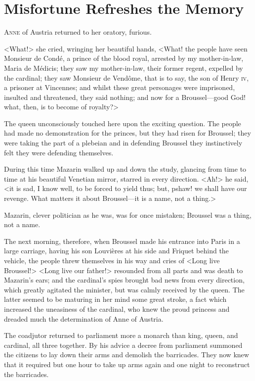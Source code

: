 \chapter{Misfortune Refreshes the Memory}

 \lettrine{A}{nne} of Austria returned to her oratory, furious.

\zz
<What!> she cried, wringing her beautiful hands, <What! the people have seen Monsieur de Condé, a prince of the blood royal, arrested by my mother-in-law, Maria de Médicis; they saw my mother-in-law, their former regent, expelled by the cardinal; they saw Monsieur de Vendôme, that is to say, the son of Henry \textsc{iv}, a prisoner at Vincennes; and whilst these great personages were imprisoned, insulted and threatened, they said nothing; and now for a Broussel—good God! what, then, is to become of royalty?>

The queen unconsciously touched here upon the exciting question. The people had made no demonstration for the princes, but they had risen for Broussel; they were taking the part of a plebeian and in defending Broussel they instinctively felt they were defending themselves.

During this time Mazarin walked up and down the study, glancing from time to time at his beautiful Venetian mirror, starred in every direction. <Ah!> he said, <it is sad, I know well, to be forced to yield thus; but, pshaw! we shall have our revenge. What matters it about Broussel—it is a name, not a thing.>

Mazarin, clever politician as he was, was for once mistaken; Broussel was a thing, not a name.

The next morning, therefore, when Broussel made his entrance into Paris in a large carriage, having his son Louvières at his side and Friquet behind the vehicle, the people threw themselves in his way and cries of <Long live Broussel!> <Long live our father!> resounded from all parts and was death to Mazarin's ears; and the cardinal's spies brought bad news from every direction, which greatly agitated the minister, but was calmly received by the queen. The latter seemed to be maturing in her mind some great stroke, a fact which increased the uneasiness of the cardinal, who knew the proud princess and dreaded much the determination of Anne of Austria.

The coadjutor returned to parliament more a monarch than king, queen, and cardinal, all three together. By his advice a decree from parliament summoned the citizens to lay down their arms and demolish the barricades. They now knew that it required but one hour to take up arms again and one night to reconstruct the barricades.

